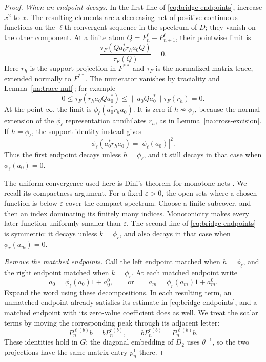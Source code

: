 \begin{proof}
\medskip\noindent
\emph{When an endpoint decays.}
In the first line of \eqref{eq:bridge-endpoints}, increase $x^2$ to $x$.
The resulting elements are a decreasing net of positive continuous
functions on the $\ell$th convergent sequence in the spectrum of $D$;
they vanish on the other component. At a finite atom
$Q=P_n^\ell-P_{n+1}^\ell$, their pointwise limit is
\[
 \frac{\tau_F(Qa_0^*r_ha_0Q)}{\tau_F(Q)}=0.
\]
Here $r_h$ is the support projection in $F^{**}$ and $\tau_F$ is the
normalized matrix trace, extended normally to $F^{**}$. The numerator
vanishes by traciality and Lemma~\ref{na:trace-null}; for example
\[
 0\leq\tau_F(r_h a_0Qa_0^*)
 \leq\|a_0Qa_0^*\|\tau_F(r_h)=0.
\]
At the point $\infty$, the limit is
$\phi_\ell(a_0^*r_ha_0)$. It is zero if $h\not\sim\phi_\ell$,
because the normal extension of the $\phi_\ell$ representation
annihilates $r_h$, as in Lemma~\ref{na:cross-excision}.
If $h=\phi_\ell$, the support identity instead gives
\[
 \phi_\ell(a_0^*r_ha_0)=|\phi_\ell(a_0)|^2.
\]
Thus the first endpoint decays unless $h=\phi_\ell$, and it still
decays in that case when $\phi_\ell(a_0)=0$.

The uniform convergence used here is Dini's theorem for monotone nets
\cite[Theorem~1.5, p.~306]{NaimpallyPeters2013}. We recall its compactness
argument. For a fixed
$\varepsilon>0$, the open sets where a chosen function is below
$\varepsilon$ cover the compact spectrum. Choose a finite subcover,
and then an index dominating its finitely many indices. Monotonicity
makes every later function uniformly smaller than $\varepsilon$.
The second line of \eqref{eq:bridge-endpoints} is symmetric: it
decays unless $k=\phi_r$, and also decays in that case when
$\phi_r(a_m)=0$.

\medskip\noindent
\emph{Remove the matched endpoints.}
Call the left endpoint matched when $h=\phi_\ell$, and the right
endpoint matched when $k=\phi_r$. At each matched endpoint write
\[
 a_0=\phi_\ell(a_0)1+a_0^0,
 \qquad\text{or}\qquad
 a_m=\phi_r(a_m)1+a_m^0.
\]
Expand the word using these decompositions. In each resulting term,
an unmatched endpoint already satisfies its estimate in
\eqref{eq:bridge-endpoints}, and a matched endpoint with its
zero-value coefficient does as well. We treat the scalar terms by
moving the corresponding peak through its adjacent letter:
\begin{equation}\label{eq:bridge-transfer}
 P_n^{\ell(b)}b=bP_n^{r(b)},
 \qquad bP_n^{r(b)}=P_n^{\ell(b)}b.
\end{equation}
These identities hold in $G$: the diagonal embedding of $D_2$ uses
$\theta^{-1}$, so the two projections have the same matrix entry
$p_n^1$ there.


\end{proof}
